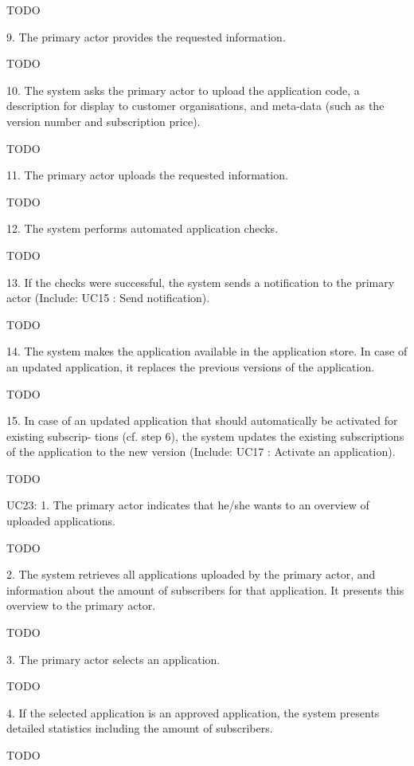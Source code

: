             TODO

        9. The primary actor provides the requested information.

            TODO

        10. The system asks the primary actor to upload the application code, a description for display to customer organisations, and meta-data (such as the version number and subscription price).

            TODO

        11. The primary actor uploads the requested information.

            TODO

        12. The system performs automated application checks.

            TODO

        13. If the checks were successful, the system sends a notification to the primary actor (Include: UC15 : Send notification).

            TODO

        14. The system makes the application available in the application store. In case of an updated application, it replaces the previous versions of the application.

            TODO

        15. In case of an updated application that should automatically be activated for existing subscrip- tions (cf. step 6), the system updates the existing subscriptions of the application to the new version (Include: UC17 : Activate an application).

            TODO
    

    UC23:
        1. The primary actor indicates that he/she wants to an overview of uploaded applications.

            TODO

        2. The system retrieves all applications uploaded by the primary actor, and information about the amount of subscribers for that application. It presents this overview to the primary actor.

            TODO

        3. The primary actor selects an application.

            TODO

        4. If the selected application is an approved application, the system presents detailed statistics including the amount of subscribers.

            TODO


